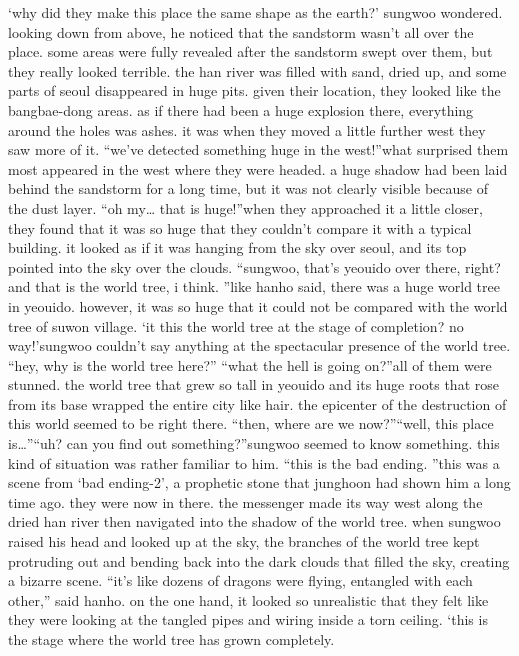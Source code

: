 ‘why did they make this place the same shape as the earth?’ sungwoo wondered.
looking down from above, he noticed that the sandstorm wasn’t all over the place.
 some areas were fully revealed after the sandstorm swept over them, but they really looked terrible.
the han river was filled with sand, dried up, and some parts of seoul disappeared in huge pits.
 given their location, they looked like the bangbae-dong areas.
as if there had been a huge explosion there, everything around the holes was ashes.
it was when they moved a little further west they saw more of it.
“we’ve detected something huge in the west!”what surprised them most appeared in the west where they were headed.
 a huge shadow had been laid behind the sandstorm for a long time, but it was not clearly visible because of the dust layer.
“oh my… that is huge!”when they approached it a little closer, they found that it was so huge that they couldn’t compare it with a typical building.
 it looked as if it was hanging from the sky over seoul, and its top pointed into the sky over the clouds.
“sungwoo, that’s yeouido over there, right? and that is the world tree, i think.
”like hanho said, there was a huge world tree in yeouido.
 however, it was so huge that it could not be compared with the world tree of suwon village.
‘it this the world tree at the stage of completion? no way!’sungwoo couldn’t say anything at the spectacular presence of the world tree.
“hey, why is the world tree here?”
“what the hell is going on?”all of them were stunned.
 the world tree that grew so tall in yeouido and its huge roots that rose from its base wrapped the entire city like hair.
 the epicenter of the destruction of this world seemed to be right there.
“then, where are we now?”“well, this place is…”“uh? can you find out something?”sungwoo seemed to know something.
 this kind of situation was rather familiar to him.
“this is the bad ending.
”this was a scene from ‘bad ending-2’, a prophetic stone that junghoon had shown him a long time ago.
 they were now in there.
the messenger made its way west along the dried han river then navigated into the shadow of the world tree.
when sungwoo raised his head and looked up at the sky, the branches of the world tree kept protruding out and bending back into the dark clouds that filled the sky, creating a bizarre scene.
“it’s like dozens of dragons were flying, entangled with each other,” said hanho.
on the one hand, it looked so unrealistic that they felt like they were looking at the tangled pipes and wiring inside a torn ceiling.
‘this is the stage where the world tree has grown completely.
